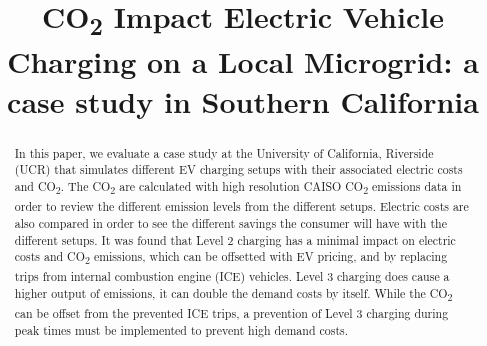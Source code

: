 \documentclass[conference]{IEEEtran}
\begin{document}
\title{CO\textsubscript{2} Impact Electric Vehicle Charging on a Local Microgrid: a case study in Southern California }

\author{
}
\maketitle

\begin{abstract}

	In this paper, we evaluate a case study at the University of California, Riverside (UCR) that simulates different EV charging setups with their associated electric costs and CO\textsubscript{2}. The CO\textsubscript{2} are calculated with high resolution CAISO CO\textsubscript{2} emissions data in order to review the different emission levels from the different setups. Electric costs are also compared in order to see the different savings the consumer will have with the different setups. It was found that Level 2 charging has a minimal impact on electric costs and CO\textsubscript{2} emissions, which can be offsetted with EV pricing, and by replacing trips from internal combustion engine (ICE) vehicles. Level 3 charging does cause a higher output of emissions, it can double the demand costs by itself. While the CO\textsubscript{2} can be offset from the prevented ICE trips, a prevention of Level 3 charging during peak times must be implemented to prevent high demand costs.
	

\end{abstract}
\end{document}
